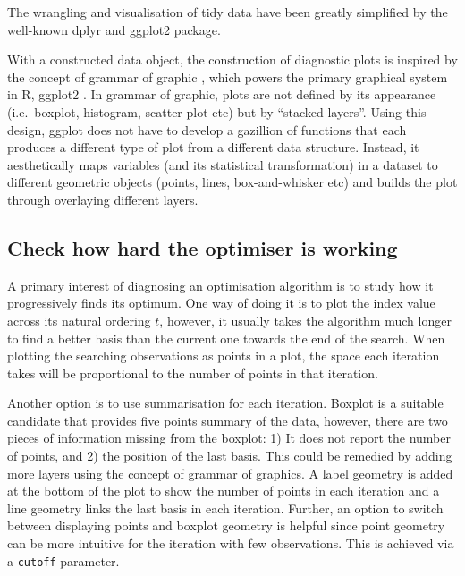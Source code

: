 \documentclass[12pt]{article}
\begin{document}
The wrangling and visualisation of tidy data have been greatly simplified by the well-known dplyr\citep{dplyr} and ggplot2\citep{ggplot2} package.

With a constructed data object, the construction of diagnostic plots is inspired by the concept of grammar of graphic \citep{wickham2010layered}, which powers the primary graphical system in R, ggplot2 \citep{ggplot2}. In grammar of graphic, plots are not defined by its appearance (i.e.~boxplot, histogram, scatter plot etc) but by ``stacked layers''. Using this design, ggplot does not have to develop a gazillion of functions that each produces a different type of plot from a different data structure. Instead, it aesthetically maps variables (and its statistical transformation) in a dataset to different geometric objects (points, lines, box-and-whisker etc) and builds the plot through overlaying different layers.

\hypertarget{check-how-hard-the-optimiser-is-working}{%
\subsection{Check how hard the optimiser is working}\label{check-how-hard-the-optimiser-is-working}}

A primary interest of diagnosing an optimisation algorithm is to study how it progressively finds its optimum. One way of doing it is to plot the index value across its natural ordering \(t\), however, it usually takes the algorithm much longer to find a better basis than the current one towards the end of the search.
When plotting the searching observations as points in a plot, the space each iteration takes will be proportional to the number of points in that iteration.

Another option is to use summarisation for each iteration. Boxplot is a suitable candidate that provides five points summary of the data, however, there are two pieces of information missing from the boxplot: 1) It does not report the number of points, and 2) the position of the last basis. This could be remedied by adding more layers using the concept of grammar of graphics. A label geometry is added at the bottom of the plot to show the number of points in each iteration and a line geometry links the last basis in each iteration. Further, an option to switch between displaying points and boxplot geometry is helpful since point geometry can be more intuitive for the iteration with few observations. This is achieved via a \texttt{cutoff} parameter.
\end{document}
